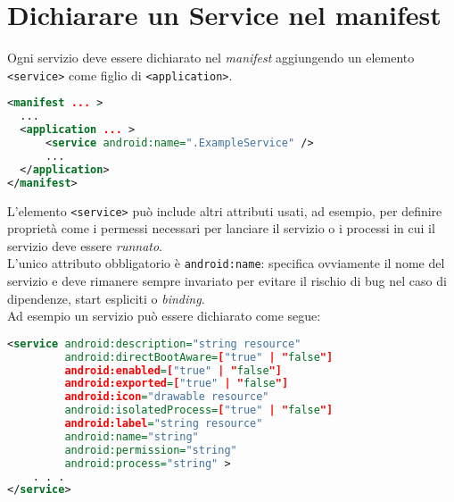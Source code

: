 \section{Dichiarare un Service nel manifest}
Ogni servizio deve essere dichiarato nel \textit{manifest} aggiungendo un elemento \texttt{<service>} come figlio di \texttt{<application>}.
\begin{lstlisting}[language=XML]
<manifest ... >
  ...
  <application ... >
      <service android:name=".ExampleService" />
      ...
  </application>
</manifest>
\end{lstlisting}

L'elemento \texttt{<service>} può include altri attributi usati, ad esempio, per definire proprietà come i permessi necessari per lanciare il servizio o i processi in cui il servizio deve essere \textit{runnato}.\\
L'unico attributo obbligatorio è \texttt{android:name}: specifica ovviamente il nome del servizio e deve rimanere sempre invariato per evitare il rischio di bug nel caso di dipendenze, start espliciti o \textit{binding}.\\
Ad esempio un servizio può essere dichiarato come segue:
\begin{lstlisting}[language=XML]
<service android:description="string resource"
         android:directBootAware=["true" | "false"]
         android:enabled=["true" | "false"]
         android:exported=["true" | "false"]
         android:icon="drawable resource"
         android:isolatedProcess=["true" | "false"]
         android:label="string resource"
         android:name="string"
         android:permission="string"
         android:process="string" >
    . . .
</service>
\end{lstlisting}



